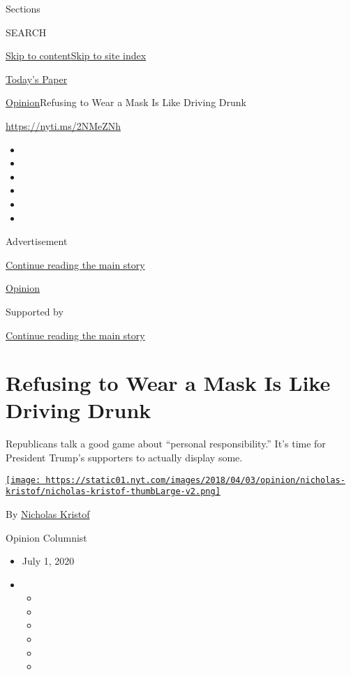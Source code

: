 Sections

SEARCH

\protect\hyperlink{site-content}{Skip to
content}\protect\hyperlink{site-index}{Skip to site index}

\href{https://myaccount.nytimes.com/auth/login?response_type=cookie\&client_id=vi}{}

\href{https://www.nytimes.com/section/todayspaper}{Today's Paper}

\href{/section/opinion}{Opinion}\textbar{}Refusing to Wear a Mask Is
Like Driving Drunk

\href{https://nyti.ms/2NMeZNh}{https://nyti.ms/2NMeZNh}

\begin{itemize}
\item
\item
\item
\item
\item
\item
\end{itemize}

Advertisement

\protect\hyperlink{after-top}{Continue reading the main story}

\href{/section/opinion}{Opinion}

Supported by

\protect\hyperlink{after-sponsor}{Continue reading the main story}

\hypertarget{refusing-to-wear-a-mask-is-like-driving-drunk}{%
\section{Refusing to Wear a Mask Is Like Driving
Drunk}\label{refusing-to-wear-a-mask-is-like-driving-drunk}}

Republicans talk a good game about ``personal responsibility.'' It's
time for President Trump's supporters to actually display some.

\href{https://www.nytimes.com/column/nicholas-kristof}{\texttt{[image: https://static01.nyt.com/images/2018/04/03/opinion/nicholas-kristof/nicholas-kristof-thumbLarge-v2.png]}}

By \href{https://www.nytimes.com/column/nicholas-kristof}{Nicholas
Kristof}

Opinion Columnist

\begin{itemize}
\item
  July 1, 2020
\item
  \begin{itemize}
  \item
  \item
  \item
  \item
  \item
  \item
  \end{itemize}
\end{itemize}

